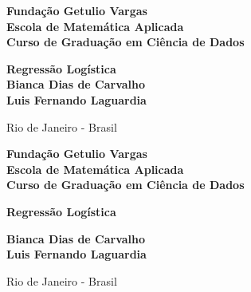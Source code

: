 \documentclass[12pt]{article}
\begin{document}
\begin{titlepage}
\begin{center}
\textbf{\LARGE Fundação Getulio Vargas}\\ 
\textbf{\LARGE Escola de Matemática Aplicada}\\
\textbf{\LARGE Curso de Graduação em Ciência de Dados}

\par
\vspace{170pt}
\textbf{\Large Regressão Logística}\\
\vspace{80pt}
\textbf{\Large Bianca Dias de Carvalho\\ Luis Fernando Laguardia}\\
\end{center}

\par
\vfill
\begin{center}
{{\normalsize Rio de Janeiro - Brasil}\\
{\normalsize \the\year}}
\end{center}
\end{titlepage}

\thispagestyle{empty}

\newpage
\begin{center}
\textbf{\LARGE Fundação Getulio Vargas}\\ 
\textbf{\LARGE Escola de Matemática Aplicada}\\
\textbf{\LARGE Curso de Graduação em Ciência de Dados}

\par
\vspace{100pt}
\textbf{\Large Regressão Logística}


\par
\vspace{150pt}

\end{center}

\par
\vspace{65pt}
\begin{center}


\hrulefill

\vspace{5pt}
\textbf{\Large Bianca Dias de Carvalho\\ Luis Fernando Laguardia}
\end{center}

\par
\vfill
\begin{center}
{{\normalsize Rio de Janeiro - Brasil}\\
{\normalsize \the\year}}
\end{center}
\end{document}
